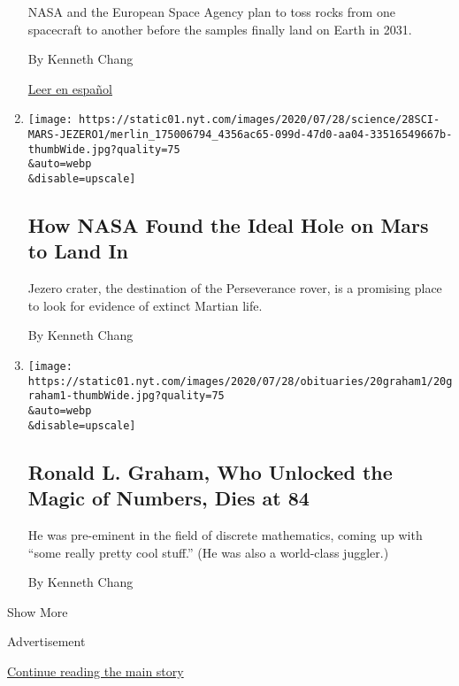 \begin{enumerate}
  NASA and the European Space Agency plan to toss rocks from one
  spacecraft to another before the samples finally land on Earth in
  2031.

  By Kenneth Chang

  \href{https://www.nytimes.com/es/2020/07/29/espanol/ciencia-y-tecnologia/mision-marte-nasa.html}{Leer
  en español}
\item
  \href{/2020/07/28/science/nasa-jezero-perseverance.html}{}

  \texttt{[image: https://static01.nyt.com/images/2020/07/28/science/28SCI-MARS-JEZERO1/merlin\_175006794\_4356ac65-099d-47d0-aa04-33516549667b-thumbWide.jpg?quality=75\\\&auto=webp\\\&disable=upscale]}

  \hypertarget{how-nasa-found-the-ideal-hole-on-mars-to-land-in}{%
  \subsection{How NASA Found the Ideal Hole on Mars to Land
  In}\label{how-nasa-found-the-ideal-hole-on-mars-to-land-in}}

  Jezero crater, the destination of the Perseverance rover, is a
  promising place to look for evidence of extinct Martian life.

  By Kenneth Chang
\item
  \href{/2020/07/23/science/ronald-l-graham-who-unlocked-the-magic-of-numbers-dies-at-84.html}{}

  \texttt{[image: https://static01.nyt.com/images/2020/07/28/obituaries/20graham1/20graham1-thumbWide.jpg?quality=75\\\&auto=webp\\\&disable=upscale]}

  \hypertarget{ronald-l-graham-who-unlocked-the-magic-of-numbers-dies-at-84}{%
  \subsection{Ronald L. Graham, Who Unlocked the Magic of Numbers, Dies
  at
  84}\label{ronald-l-graham-who-unlocked-the-magic-of-numbers-dies-at-84}}

  He was pre-eminent in the field of discrete mathematics, coming up
  with ``some really pretty cool stuff.'' (He was also a world-class
  juggler.)

  By Kenneth Chang
\end{enumerate}

Show More

Advertisement

\protect\hyperlink{after-mid2}{Continue reading the main story}

